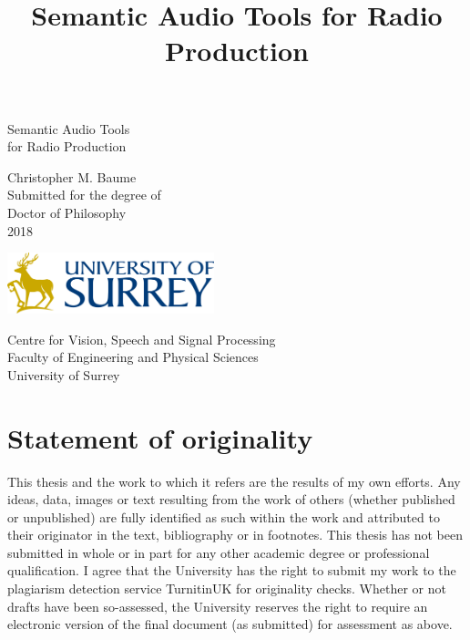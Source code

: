\documentclass[11pt,a4paper,twoside,openany]{book}
\title{Semantic Audio Tools for Radio Production}
\begin{document}
\pagestyle{plain}
\frontmatter

\begin{titlepage}
  \vspace*{\fill}
  \begin{center}
    {\Huge Semantic Audio Tools\\for Radio Production\par\vspace{1.5cm}}
    {\Large Christopher M. Baume}\\[1cm]
    {\large Submitted for the degree of}\\
    {\Large Doctor of Philosophy}\\[1cm]
    {\Large 2018}\\[1cm]
    \begin{center}
      \includegraphics[width=6cm]{figs/surrey-logo.png}\\[1cm]
    \end{center}
    Centre for Vision, Speech and Signal Processing\\
      Faculty of Engineering and Physical Sciences\\
      University of Surrey%
  \end{center}
  \vspace*{\fill}
\end{titlepage}

\setcounter{page}{0}
\cleardoublepage


\chapter*{Statement of originality}
This thesis and the work to which it refers are the results of my own efforts. Any ideas, data, images or text
resulting from the work of others (whether published or unpublished) are fully identified as such within the work and
attributed to their originator in the text, bibliography or in footnotes. This thesis has not been submitted in whole
or in part for any other academic degree or professional qualification.  I agree that the University has the right to
submit my work to the plagiarism detection service TurnitinUK for originality checks.  Whether or not drafts have been
so-assessed, the University reserves the right to require an electronic version of the final document (as submitted)
for assessment as above. 
\end{document}
